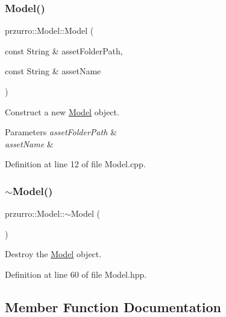 \subsubsection{\texorpdfstring{Model()}{Model()}}
{\footnotesize\ttfamily przurro\+::\+Model\+::\+Model (\begin{DoxyParamCaption}\item[{const String \&}]{asset\+Folder\+Path,  }\item[{const String \&}]{asset\+Name }\end{DoxyParamCaption})}



Construct a new \mbox{\hyperlink{classprzurro_1_1_model}{Model}} object. 


\begin{DoxyParams}{Parameters}
{\em asset\+Folder\+Path} & \\
\hline
{\em asset\+Name} & \\
\hline
\end{DoxyParams}


Definition at line 12 of file Model.\+cpp.

\mbox{\label{classprzurro_1_1_model_aa364e361f37b8e534bc3b6a66d4f4e4e}} 
\subsubsection{\texorpdfstring{$\sim$Model()}{~Model()}}
{\footnotesize\ttfamily przurro\+::\+Model\+::$\sim$\+Model (\begin{DoxyParamCaption}{ }\end{DoxyParamCaption})\hspace{0.3cm}{\ttfamily [inline]}}



Destroy the \mbox{\hyperlink{classprzurro_1_1_model}{Model}} object. 



Definition at line 60 of file Model.\+hpp.



\subsection{Member Function Documentation}
\mbox{\label{classprzurro_1_1_model_acc2f2e7746c7d3a9cec619d103f3889d}} 
